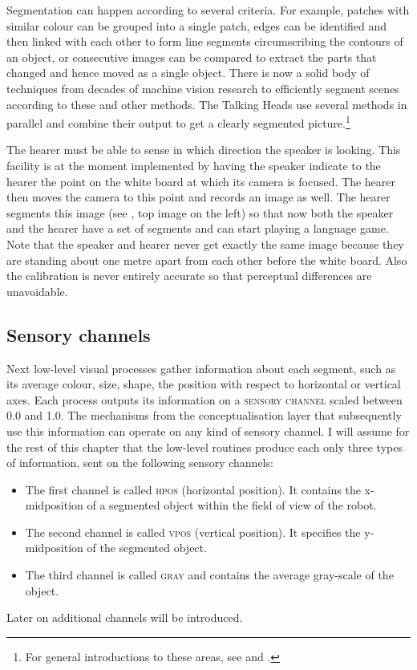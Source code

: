 Segmentation can happen according to several criteria. 
For example, patches with similar colour can be grouped 
into a single patch, edges can be identified 
and then linked with each other to form line segments
circumscribing the contours of 
an object, or consecutive images can be compared to extract the parts
that changed and hence moved as a single object. 
There is now a solid body of techniques from decades
of machine vision research to efficiently segment scenes according to 
these and other methods. The Talking Heads use several methods
in parallel and combine their output to get a clearly segmented
picture.\footnote{For general introductions to these areas, 
see  \cite{Ballard:1982} and \cite{Fischler:1987}.}

The hearer must be able to sense in which direction the speaker is looking. 
This facility is at the moment implemented by having 
the speaker indicate to the hearer the point on the white board 
at which its camera is focused. The hearer then moves the camera
to this point and records an image as well. The hearer segments 
this image (see , top image on the left) so that 
now both the speaker 
and the hearer have a set of segments and can start playing 
a language game. Note that the speaker and hearer never get 
exactly the same image because they are standing about one 
metre apart from each other before the white board. Also the
calibration is never entirely accurate so that perceptual 
differences are unavoidable.

\subsection{Sensory channels}

Next low-level visual processes gather information about each 
segment, such as its average colour, size, shape,
the position with respect to horizontal or vertical axes. 
Each process outputs its information on a {\scshape sensory 
channel} scaled between 0.0 and 1.0. The mechanisms from 
the conceptualisation layer that subsequently use this information
can operate on any kind of sensory channel. 
I will assume for the rest of this chapter that the low-level
routines produce each only three types of information, sent
on the following sensory channels: 
\begin{itemize}
\item The first channel is called \textsc{hpos} (horizontal position). 
It contains the x-midpos\-ition of a segmented object within
the field of view of the robot. 
\item The second channel is called \textsc{vpos} (vertical position). It
specifies the y-midpos\-ition of the segmented object. 
\item The third channel is called \textsc{gray} and contains 
the average gray-scale of the object. 
\end{itemize}
Later on additional channels will be introduced. 

